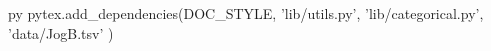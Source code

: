 \usepackage{booktabs}
\usepackage{graphicx}
\usepackage{graphviz}
\usepackage{hyperref} %
\usepackage{makecell}
\usepackage{minted}
\usepackage{multicol}
\usepackage{siunitx}
\usepackage{subcaption}

\newcommand\SIci[5]{\SI{#1}{#2}, {#3}CI: \SIrange{#4}{#5}{#2}}


\begin{pythontexcustomcode}[begin]{py}
pytex.add_dependencies(DOC_STYLE,
	'lib/utils.py',
	'lib/categorical.py',
	'data/JogB.tsv'
	)
\end{pythontexcustomcode}
